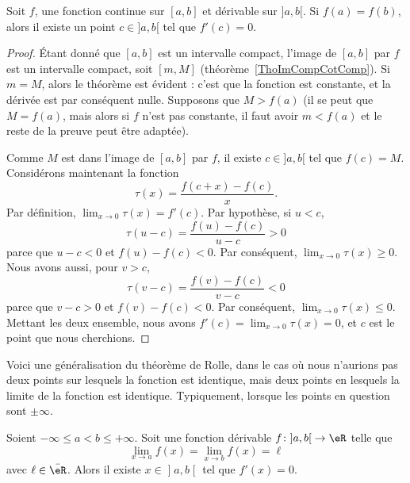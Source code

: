 \begin{theorem}       \label{ThoRolle}
	Soit \( f\), une fonction continue sur \( [a,b]\) et dérivable sur \( ]a,b[\). Si \( f(a)=f(b)\), alors il existe un point \( c\in]a,b[\) tel que \( f'(c)=0\).
\end{theorem}

\begin{proof}
	Étant donné que \( [a,b]\) est un intervalle compact, l'image de \( [a,b]\) par \( f\) est un intervalle compact, soit \( [m,M]\) (théorème~\ref{ThoImCompCotComp}). Si \( m=M\), alors le théorème est évident : c'est que la fonction est constante, et la dérivée est par conséquent nulle. Supposons que \( M> f(a)\) (il se peut que \( M=f(a)\), mais alors si \( f\) n'est pas constante, il faut avoir \( m<f(a)\) et le reste de la preuve peut être adaptée).

	Comme \( M\) est dans l'image de \( [a,b]\) par \( f\), il existe \( c\in ]a,b[\) tel que \( f(c)=M\). Considérons maintenant la fonction
	\begin{equation}
		\tau(x) =\frac{ f(c+x)-f(c) }{ x }.
	\end{equation}
	Par définition, \( \lim_{x\to 0}\tau(x)=f'(c)\). Par hypothèse, si \( u<c\),
	\begin{equation}
		\tau(u-c) = \frac{ f(u)-f(c) }{ u-c }>0
	\end{equation}
	parce que \( u-c<0\) et \( f(u)-f(c)<0\). Par conséquent, \( \lim_{x\to 0}\tau(x)\geq 0\). Nous avons aussi, pour \( v>c\),
	\begin{equation}
		\tau(v-c) = \frac{ f(v)-f(c) }{ v-c }<0
	\end{equation}
	parce que \( v-c>0\) et \( f(v)-f(c)<0\). Par conséquent, \( \lim_{x\to 0}\tau(x)\leq 0\). Mettant les deux ensemble, nous avons \( f'(c)=\lim_{x\to 0}\tau(x)=0\), et \( c\) est le point que nous cherchions.
\end{proof}

Voici une généralisation du théorème de Rolle, dans le cas où nous n'aurions pas deux points sur lesquels la fonction est identique, mais deux points en lesquels la limite de la fonction est identique. Typiquement, lorsque les points en question sont \( \pm\infty\).
\begin{theorem}       \label{THOooXDTBooFeSZoK}
	Soient \( -\infty\leq a<b\leq +\infty\). Soit une fonction dérivable \( f\colon \mathopen] a , b \mathclose[\to \eR\) telle que
		\begin{equation}
			\lim_{x\to a} f(x)=\lim_{x\to b} f(x)=\ell
		\end{equation}
		avec \( \ell\in \bar \eR\). Alors il existe \( x\in \mathopen] a , b \mathclose[\) tel que \( f'(x)=0\).
\end{theorem}

